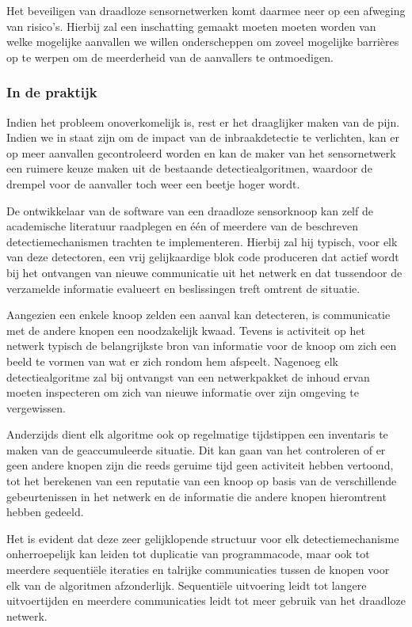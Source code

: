 \documentclass[DIV=calc,paper=a4,fontsize=11pt,twocolumn,draft]{scrartcl}
\newcommand{\heading}[1]{
\subsubsection*{#1}
\vspace{-2mm}
}
\begin{document}
Het beveiligen van draadloze sensornetwerken komt daarmee neer op een afweging
van risico's. Hierbij zal een inschatting gemaakt moeten moeten worden van
welke mogelijke aanvallen we willen onderscheppen om zoveel mogelijke
barri\`eres op te werpen om de meerderheid van de aanvallers te ontmoedigen.

\heading{In de praktijk}

Indien het probleem onoverkomelijk is, rest er het draaglijker maken van de
pijn. Indien we in staat zijn om de impact van de inbraakdetectie te
verlichten, kan er op meer aanvallen gecontroleerd worden en kan de maker van
het sensornetwerk een ruimere keuze maken uit de bestaande detectiealgoritmen,
waardoor de drempel voor de aanvaller toch weer een beetje hoger wordt.

De ontwikkelaar van de software van een draadloze sensorknoop kan zelf de
academische literatuur raadplegen en \'e\'en of meerdere van de beschreven
detectiemechanismen trachten te implementeren. Hierbij zal hij typisch, voor
elk van deze detectoren, een vrij gelijkaardige blok code produceren dat actief
wordt bij het ontvangen van nieuwe communicatie uit het netwerk en dat
tussendoor de verzamelde informatie evalueert en beslissingen treft omtrent de
situatie.

Aangezien een enkele knoop zelden een aanval kan detecteren, is communicatie
met de andere knopen een noodzakelijk kwaad. Tevens is activiteit op het
netwerk typisch de belangrijkste bron van informatie voor de knoop om zich een
beeld te vormen van wat er zich rondom hem afspeelt. Nagenoeg elk
detectiealgoritme zal bij ontvangst van een netwerkpakket de inhoud ervan
moeten inspecteren om zich van nieuwe informatie over zijn omgeving te
vergewissen.

Anderzijds dient elk algoritme ook op regelmatige tijdstippen een inventaris te
maken van de geaccumuleerde situatie. Dit kan gaan van het controleren of er
geen andere knopen zijn die reeds geruime tijd geen activiteit hebben vertoond,
tot het berekenen van een reputatie van een knoop op basis van de verschillende
gebeurtenissen in het netwerk en de informatie die andere knopen hieromtrent
hebben gedeeld.

Het is evident dat deze zeer gelijklopende structuur voor elk
detectiemechanisme onherroepelijk kan leiden tot duplicatie van programmacode,
maar ook tot meerdere sequenti\"ele iteraties en talrijke communicaties tussen
de knopen voor elk van de algoritmen afzonderlijk. Sequenti\"ele uitvoering
leidt tot langere uitvoertijden en meerdere communicaties leidt tot meer
gebruik van het draadloze netwerk.
\end{document}
